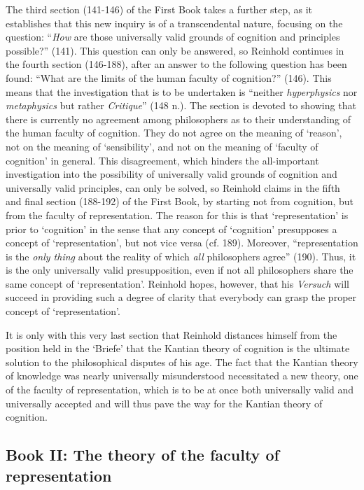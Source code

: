  The third section (141{-}146) of the First Book takes a further step, as it establishes that this new inquiry is of a transcendental nature, focusing on the question: ``\textit{How} are those universally valid grounds of cognition and principles possible?'' (141). This question can only be answered, so Reinhold continues in the fourth section (146{-}188), after an answer to the following question has been found: ``What are the limits of the human faculty of cognition?'' (146). This means that the investigation that is to be undertaken is ``neither \textit{hyperphysics} nor \textit{metaphysics} but rather \textit{Critique}'' (148 n.). The section is devoted to showing that there is currently no agreement among philosophers as to their understanding of the human faculty of cognition. They do not agree on the meaning of `reason', not on the meaning of `sensibility', and not on the meaning of `faculty of cognition' in general. This disagreement, which hinders the all{-}important investigation into the possibility of universally valid grounds of cognition and universally valid principles, can only be solved, so Reinhold claims in the fifth and final section (188{-}192) of the First Book, by starting not from cognition, but from the faculty of representation. The reason for this is that `representation' is prior to `cognition' in the sense that any concept of `cognition' presupposes a concept of `representation', but not vice versa (cf. 189). Moreover, ``representation is the \textit{only thing} about the reality of which \textit{all} philosophers agree'' (190). Thus, it is the only universally valid presupposition, even if not all philosophers share the same concept of `representation'. Reinhold hopes, however, that his \textit{Versuch} will succeed in providing such a degree of clarity that everybody can grasp the proper concept of `representation'. 

 It is only with this very last section that Reinhold distances himself from the position held in the `Briefe' that the Kantian theory of cognition is the ultimate solution to the philosophical disputes of his age. The fact that the Kantian theory of knowledge was nearly universally misunderstood necessitated a new theory, one of the faculty of representation, which is to be at once both universally valid and universally accepted and will thus pave the way for the Kantian theory of cognition. 


\subsection{Book II: The theory of the faculty of representation}


